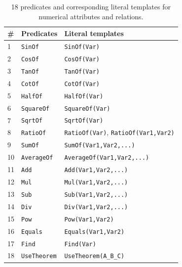 \begin{table}[ht]
\centering 
\footnotesize
\begin{tabular}{lll}
	\toprule
	\# & \textbf{Predicates} & \textbf{Literal templates} \\
	\midrule
	1 & \texttt{SinOf} & \texttt{SinOf(Var)} \\
	2 & \texttt{CosOf} & \texttt{CosOf(Var)} \\
	3 & \texttt{TanOf} & \texttt{TanOf(Var)}\\
	4 & \texttt{CotOf} & \texttt{CotOf(Var)} \\
	5 &	\texttt{HalfOf} & \texttt{HalfOf(Var)}\\
	6 & \texttt{SquareOf} & \texttt{SquareOf(Var)}\\
	7 & \texttt{SqrtOf} & \texttt{SqrtOf(Var)}\\
	8 & \texttt{RatioOf} & \texttt{RatioOf(Var)}, \texttt{RatioOf(Var1,Var2)}\\
	9 &\texttt{SumOf} & \texttt{SumOf(Var1,Var2,...)}\\
	10 & \texttt{AverageOf} & 	\texttt{AverageOf(Var1,Var2,...)}\\
	11 & \texttt{Add} & \texttt{Add(Var1,Var2,...)} \\
	12 & \texttt{Mul} & \texttt{Mul(Var1,Var2,...)}\\
	13 & \texttt{Sub} & \texttt{Sub(Var1,Var2,...)}\\
	14 & \texttt{Div} & \texttt{Div(Var1,Var2,...)}\\
	15 & \texttt{Pow} & \texttt{Pow(Var1,Var2)} \\
	16 & \texttt{Equals} & \texttt{Equals(Var1,Var2)}\\
	17 & \texttt{Find} & \texttt{Find(Var)}\\
	18 & \texttt{UseTheorem} & \texttt{UseTheorem(A\_B\_C)}\\
	\bottomrule
\end{tabular}
\caption{18 predicates and corresponding literal templates for  numerical attributes and relations.}
\label{appex:predicate6}
\end{table}
